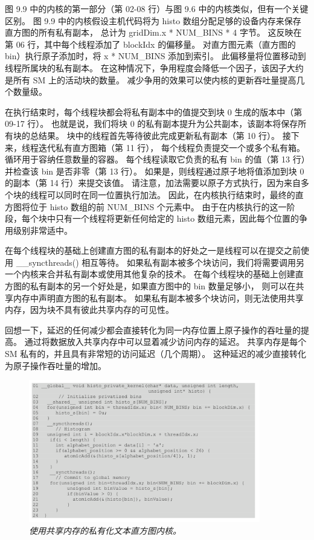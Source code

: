 图 9.9 中的内核的第一部分（第 02-08 行）与图 9.6 中的内核类似，但有一个关键区别。 
图 9.9 中的内核假设主机代码将为 histo 数组分配足够的设备内存来保存直方图的所有私有副本，
总计为 gridDim.x * NUM\_BINS * 4 字节。 这反映在第 06 行，其中每个线程添加了 blockIdx 的偏移量。 
对直方图元素（直方图的 bin）执行原子添加时，将 x * NUM\_BINS 添加到索引。 
此偏移量将位置移动到线程所属块的私有副本。 在这种情况下，争用程度会降低一个因子，该因子大约是所有 SM 上的活动块的数量。 
减少争用的效果可以使内核的更新吞吐量提高几个数量级。

在执行结束时，每个线程块都会将私有副本中的值提交到块 0 生成的版本中（第 09-17 行）。 
也就是说，我们将块 0 的私有副本提升为公共副本，该副本将保存所有块的总结果。 
块中的线程首先等待彼此完成更新私有副本（第 10 行）。 接下来，线程迭代私有直方图箱（第 11 行），
每个线程负责提交一个或多个私有箱。 循环用于容纳任意数量的容器。 
每个线程读取它负责的私有 bin 的值（第 13 行）并检查该 bin 是否非零（第 13 行）。 
如果是，则线程通过原子地将值添加到块 0 的副本（第 14 行）来提交该值。 
请注意，加法需要以原子方式执行，因为来自多个块的线程可以同时在同一位置执行加法。 
因此，在内核执行结束时，最终的直方图将位于 histo 数组的前 NUM\_BINS 个元素中。 
由于在内核执行的这一阶段，每个块中只有一个线程将更新任何给定的 histo 数组元素，因此每个位置的争用级别非常适中。

在每个线程块的基础上创建直方图的私有副本的好处之一是线程可以在提交之前使用 \_\_syncthreads() 相互等待。 
如果私有副本被多个块访问，我们将需要调用另一个内核来合并私有副本或使用其他复杂的技术。 
在每个线程块的基础上创建直方图的私有副本的另一个好处是，如果直方图中的 bin 数量足够小，
则可以在共享内存中声明直方图的私有副本。 如果私有副本被多个块访问，则无法使用共享内存，因为块不具有彼此共享内存的可见性。

回想一下，延迟的任何减少都会直接转化为同一内存位置上原子操作的吞吐量的提高。 
通过将数据放入共享内存中可以显着减少访问内存的延迟。 共享内存是每个 SM 私有的，并且具有非常短的访问延迟（几个周期）。 
这种延迟的减少直接转化为原子操作吞吐量的增加。

\begin{figure}[H]
	\centering
	\includegraphics[width=0.9\textwidth]{figs/F9.10.png}
	\caption{\textit{使用共享内存的私有化文本直方图内核。}}
\end{figure}

